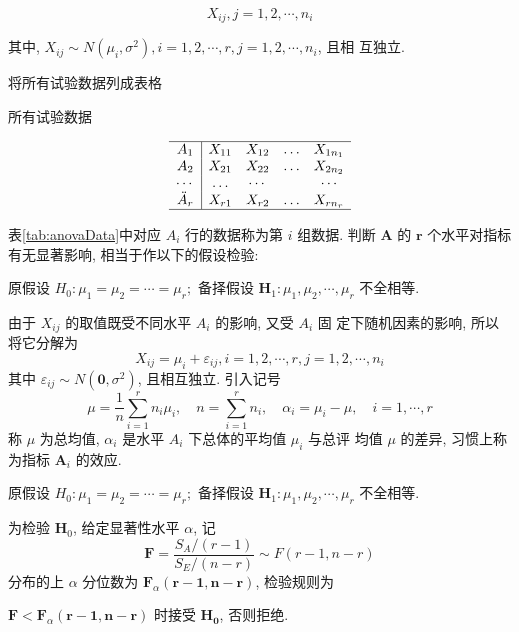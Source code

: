 $$
X_{i j}, j=1,2, \cdots, n_{i}
$$

其中, $X_{i j} \sim N\left(\mu_{i}, \sigma^{2}\right), i=1,2, \cdots, r, j=1,2, \cdots, n_{i}$, 且相
互独立. 

将所有试验数据列成表格

\begin{table}
\caption{所有试验数据}
      \label{tab:anovaData}
$$\begin{array}{c|cccc}
    \hline A_{1} & X_{11} & X_{12} & \ldots & X_{1 n_{1}} \\
    A_{2} & X_{21} & X_{22} & \ldots & X_{2 n_{2}} \\
    \cdots & \ldots & \cdots & & \cdots \\
    \ddot{A}_{r} & X_{r 1} & X_{r 2} & \ldots & X_{r n_{r}} \\
    \hline
    \end{array}
$$  
\end{table}


表\cref{tab:anovaData}中对应 $A_{i}$ 行的数据称为第 $i$ 组数据. 判断 $\boldsymbol{A}$ 的 $\boldsymbol{r}$ 个水平对指标有无显著影响, 相当于作以下的假设检验:

原假设 $H_{0}: \mu_{1}=\mu_{2}=\cdots=\mu_{r} ;$
备择假设 $\boldsymbol{H}_{1}: \mu_{1}, \mu_{2}, \cdots, \mu_{r}$ 不全相等. 

由于 \( X_{i j} \) 的取值既受不同水平 \( A_{i} \) 的影响, 又受 \( A_{i} \) 固 定下随机因素的影响, 所以将它分解为
$$
X_{i j}=\mu_{i}+\varepsilon_{i j}, i=1,2, \cdots, r, j=1,2, \cdots, n_{i}\label{eq:anovaDecomposition}
$$
其中 \( \varepsilon_{i j} \sim N\left(\mathbf{0}, \sigma^{2}\right) \), 且相互独立. 引入记号
$$
\mu=\frac{1}{n} \sum_{i=1}^{r} n_{i} \mu_{i}, \quad n=\sum_{i=1}^{r} n_{i}, \quad \alpha_{i}=\mu_{i}-\mu, \quad i=1, \cdots, r
$$
称 \( \mu \) 为总均值, \( \alpha_{i} \) 是水平 \( A_{i} \) 下总体的平均值 \( \mu_{i} \) 与总评
均值 \( \mu \) 的差异, 习惯上称为指标 \( \boldsymbol{A}_{i} \) 的效应. 

\begin{definition}
原假设 $H_{0}: \mu_{1}=\mu_{2}=\cdots=\mu_{r} ;$
备择假设 $\boldsymbol{H}_{1}: \mu_{1}, \mu_{2}, \cdots, \mu_{r}$ 不全相等. 

为检验 \( \boldsymbol{H}_{0} \), 给定显著性水平 \( \alpha \), 记 \[ \boldsymbol{F}=\frac{S_{A} /(r-1)}{S_{E} /(n-r)} \sim F(r-1, n-r) \] 分布的上 \( \alpha \) 分位数为 \( \boldsymbol{F}_{\alpha}(\boldsymbol{r}-\mathbf{1}, \boldsymbol{n}-\boldsymbol{r}) \), 检验规则为

\( \boldsymbol{F}<\boldsymbol{F}_{\alpha}(\boldsymbol{r}-\mathbf{1}, \boldsymbol{n}-\boldsymbol{r}) \) 时接受 \( \boldsymbol{H}_{\mathbf{0}} \), 否则拒绝. 
\end{definition}

